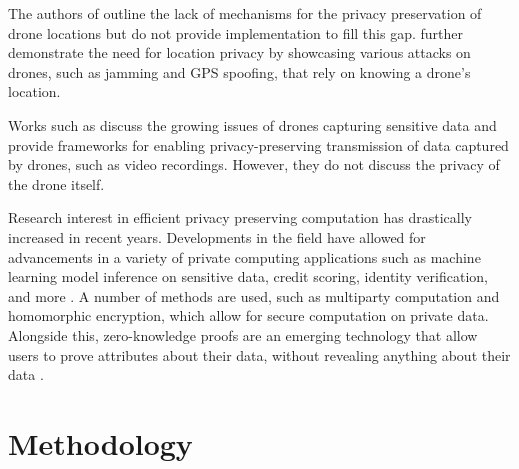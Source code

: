 \documentclass[9pt,sigconf,screen]{acmart}
\newcommand{\nojan}[1]{\textcolor{red}{{\sf (NS:} {\sl{#1})}}}
\newcommand{\yaman}[1]{\textcolor{blue}{{\sf (YJ:} {\sl{#1})}}}
\newcommand{\nasimeh}[1]{\textcolor{purple}{{\sf (NH:} {\sl{#1})}}}
\begin{document}
The authors of \cite{IODdesign} outline the lack of mechanisms for the privacy preservation of drone locations but do not provide implementation to fill this gap. \cite{jammingAttacks, attacks2} further demonstrate the need for location privacy by showcasing various attacks on drones, such as jamming and GPS spoofing, that rely on knowing a drone's location.

Works such as \cite{Akkaya, darksky} discuss the growing issues of drones capturing sensitive data and provide frameworks for enabling privacy-preserving transmission of data captured by drones, such as video recordings. However, they do not discuss the privacy of the drone itself. 

Research interest in efficient privacy preserving computation has drastically increased in recent years. Developments in the field have allowed for advancements in a variety of private computing applications such as machine learning model inference on sensitive data, credit scoring, identity verification, and more \cite{passwordAuth, chameleon, creditScoring}. A number of methods are used, such as multiparty computation and homomorphic encryption, which allow for secure computation on private data. Alongside this, zero-knowledge proofs are an emerging technology that allow users to prove attributes about their data, without revealing anything about their data \cite{zk}.

\section{Methodology}\label{methodology}

\end{document}
